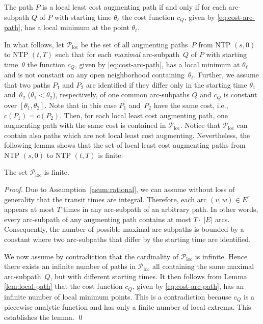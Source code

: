 \documentclass{svjour3}                     \smartqed
\newcommand{\loc}{\ensuremath{\text{loc}}}
\begin{document}
\begin{lemma}
\label{lem:local-path}
The path $P$ is a local least cost augmenting path if and only if for each arc-subpath $Q$ of $P$ with starting time $\theta_\ell$ the cost function $c_{Q}$, given by \eqref{eq:cost-arc-path}, has a local minimum at the point $\theta_\ell$.
\end{lemma}


In what follows, let $\mathcal{P}_{\loc}$ be the set of all augmenting paths~$P$ from NTP $(s,0)$ to NTP $(t,T)$ such that for each \emph{maximal} arc-subpath~$Q$ of $P$ with starting time~$\theta$ the function $c_{Q}$, given by \eqref{eq:cost-arc-path}, has a local minimum at $\theta_\ell$ and is not constant on any open neighborhood containing~$\theta_\ell$. Further, we assume that two paths $P_1$ and $P_2$ are identified if they differ only in the starting time $\theta_1$ and~$\theta_2$ ($\theta_1<\theta_2$), respectively, of one common arc-subpaths $Q$ and $c_{Q}$ is constant over $[\theta_1,\theta_2]$. Note that in this case $P_1$ and~$P_2$ have the same cost, i.e., $c(P_1)=c(P_2)$. Then, for each local least cost augmenting path, one augmenting path with the same cost is contained in $\mathcal{P}_{\loc}$. Notice that $\mathcal{P}_{\loc}$ can contain also paths which are not local least cost augmenting. Nevertheless, the following lemma shows that the set of local least cost augmenting paths from NTP $(s,0)$ to NTP $(t,T)$ is finite.

\begin{lemma}
  \label{lem:analytic-nonempty-finite}
  The set $\mathcal{P}_{\loc}$ is finite.
\end{lemma}
\begin{proof}
Due to Assumption~\ref{asum:rational}, we can assume without loss of generality that the transit times are integral. Therefore, each arc $(v,w)\in E^r$ appears at most $T$ times in any arc-subpath of an arbitrary path. In other words, every arc-subpath of any augmenting path contains at most $T\cdot~|E|$ arcs. Consequently, the number of
possible maximal arc-subpaths is bounded by a constant where two arc-subpaths that differ by the starting time are identified.

We now assume by contradiction that the cardinality of $\mathcal{P}_{\loc}$ is infinite. Hence there exists an infinite number of paths in $\mathcal{P}_{\loc}$ all containing the same
maximal arc-subpath~$Q$, but with different starting times. It then follows from Lemma \ref{lem:local-path} that
the cost function $c_Q$, given by \eqref{eq:cost-arc-path}, has an infinite number of local minimum points. This is a contradiction because $c_Q$ is a piecewise analytic function and has only a finite number of local extrema. This establishes the lemma.
\qed\end{proof}
\end{document}
